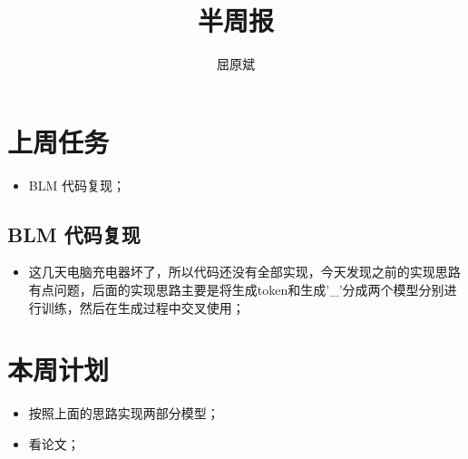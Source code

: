 \documentclass[UTF8]{article}
\title{半周报}
\author{屈原斌}
\begin{document}
	\maketitle
	\section{上周任务}
		\begin{itemize}
			\item BLM 代码复现；
		\end{itemize}

	\subsection{BLM 代码复现}
		\begin{itemize}
			\item 这几天电脑充电器坏了，所以代码还没有全部实现，今天发现之前的实现思路有点问题，后面的实现思路主要是将生成token和生成'\_'分成两个模型分别进行训练，然后在生成过程中交叉使用；
		\end{itemize}
		
	\section{本周计划}
		\begin{itemize}
			\item 按照上面的思路实现两部分模型；
			\item 看论文；
		\end{itemize}
\end{document}
